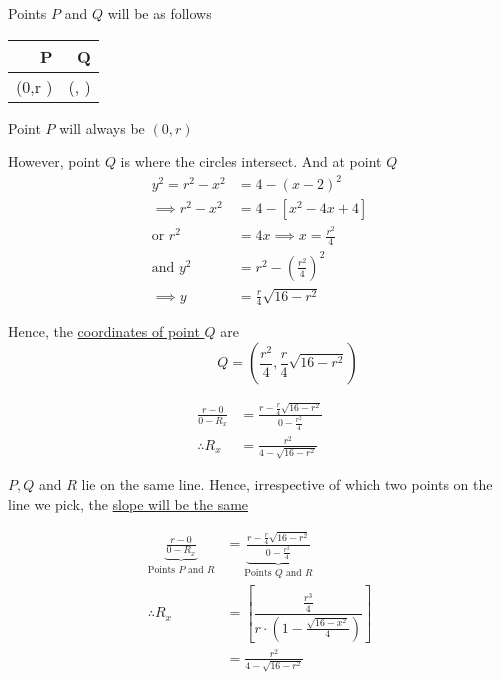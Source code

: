 \documentclass[14pt,fleqn]{extarticle}
\newcommand\xq{\frac{r^2}{4}}
\newcommand\yq{\frac{r}{4}\sqrt{16-r^2}}
\newcommand\rx{\frac{r^2}{4-\sqrt{16-r^2}}}
\begin{document}
\begin{question}
\begin{step}
\begin{options}
     \incorrect

Points $P$ and $Q$ will be as follows 
      
      \begin{center}
  \begin{tabular}{NN}
   \toprule
        P & Q \\
   \midrule 
   \left(0,r \right) & \left(, \right) \\
    \bottomrule
  \end{tabular}
\end{center}

        
    \end{options} 
     \reason 
     
     Point $P$ will always be $(0,r)$ \newline 
     
     However, point $Q$ is where the circles intersect. And at point $Q$ 
     \begin{align}
     y^2 = r^2 - x^2 &= 4 - (x-2)^2 \\
     \implies r^2 - x^2 &= 4 - \left[x^2 - 4x + 4 \right] \\
     \text{or } r^2 &= 4x \implies x = \frac{r^2}{4} \\
     \text{and } y^2 &= r^2 - \left(\frac{r^2}{4} \right)^2 \\
     \implies y &= \yq 
\end{align}

Hence, the \underline{coordinates of point $Q$} are 
\[ \qquad\qquad Q = \left(\xq,\yq \right)\]
       
\end{step}

\begin{step}
  \begin{options} 
     \correct 
       
       \begin{align}
	\frac{r-0}{0-R_x} &= \frac{r-\yq}{0-\xq} \\
	\therefore R_x &= \frac{r^2}{4-\sqrt{16-r^2}}
\end{align}

        
    \end{options} 
     \reason 
     
     $P,Q$ and $R$ lie on the same line. Hence, irrespective of which two points on the line we pick, the \underline{slope will be the same}
     
     \begin{align}
     \underbrace{\frac{r-0}{0-R_x}}_{\text{Points $P$ and $R$}} &= 
     \underbrace{\frac{r-\yq}{0-\xq}}_{\text{Points $Q$ and $R$}} \\
     \therefore R_x &= \left[\dfrac{\frac{r^3}{4}}{r\cdot \left(1-\frac{\sqrt{16-x^2}}{4} \right)} \right] \\
     &= \rx
\end{align}
       

\end{step}
\end{question}
\end{document}
